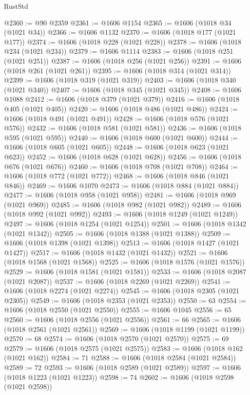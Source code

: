 \begin{lexlean}{RustStd}
\begin{coremodule}
{\begin{coremodule}
{{{{{{{{{{{{{{{{{{{{{{{{{{{{{{{{{{{{{{{{{{{{{{{{{{{{{{{{{{{{{{{{{{{{@2360 := @90 @2359
@2361 := @1606 @1154
@2365 := @1606 (@1018 @34 (@1021 @34))
@2366 := @1606 @1132
@2370 := @1606 (@1018 @177 (@1021 @177))
@2374 := @1606 (@1018 @228 (@1021 @228))
@2378 := @1606 (@1018 @234 (@1021 @234))
@2379 := @1606 @1114
@2383 := @1606 (@1018 @251 (@1021 @251))
@2387 := @1606 (@1018 @256 (@1021 @256))
@2391 := @1606 (@1018 @261 (@1021 @261))
@2395 := @1606 (@1018 @314 (@1021 @314))
@2399 := @1606 (@1018 @319 (@1021 @319))
@2403 := @1606 (@1018 @340 (@1021 @340))
@2407 := @1606 (@1018 @345 (@1021 @345))
@2408 := @1606 @1088
@2412 := @1606 (@1018 @379 (@1021 @379))
@2416 := @1606 (@1018 @405 (@1021 @405))
@2420 := @1606 (@1018 @486 (@1021 @486))
@2424 := @1606 (@1018 @491 (@1021 @491))
@2428 := @1606 (@1018 @576 (@1021 @576))
@2432 := @1606 (@1018 @581 (@1021 @581))
@2436 := @1606 (@1018 @595 (@1021 @595))
@2440 := @1606 (@1018 @600 (@1021 @600))
@2444 := @1606 (@1018 @605 (@1021 @605))
@2448 := @1606 (@1018 @623 (@1021 @623))
@2452 := @1606 (@1018 @628 (@1021 @628))
@2456 := @1606 (@1018 @676 (@1021 @676))
@2460 := @1606 (@1018 @708 (@1021 @708))
@2464 := @1606 (@1018 @772 (@1021 @772))
@2468 := @1606 (@1018 @846 (@1021 @846))
@2469 := @1606 @1070
@2473 := @1606 (@1018 @884 (@1021 @884))
@2477 := @1606 (@1018 @958 (@1021 @958))
@2481 := @1606 (@1018 @969 (@1021 @969))
@2485 := @1606 (@1018 @982 (@1021 @982))
@2489 := @1606 (@1018 @992 (@1021 @992))
@2493 := @1606 (@1018 @1249 (@1021 @1249))
@2497 := @1606 (@1018 @1254 (@1021 @1254))
@2501 := @1606 (@1018 @1342 (@1021 @1342))
@2505 := @1606 (@1018 @1388 (@1021 @1388))
@2509 := @1606 (@1018 @1398 (@1021 @1398))
@2513 := @1606 (@1018 @1427 (@1021 @1427))
@2517 := @1606 (@1018 @1432 (@1021 @1432))
@2521 := @1606 (@1018 @1568 (@1021 @1568))
@2525 := @1606 (@1018 @1576 (@1021 @1576))
@2529 := @1606 (@1018 @1581 (@1021 @1581))
@2533 := @1606 (@1018 @2087 (@1021 @2087))
@2537 := @1606 (@1018 @2269 (@1021 @2269))
@2541 := @1606 (@1018 @2274 (@1021 @2274))
@2545 := @1606 (@1018 @2305 (@1021 @2305))
@2549 := @1606 (@1018 @2353 (@1021 @2353))
@2550 := 63
@2554 := @1606 (@1018 @2550 (@1021 @2550))
@2555 := @1606 @1045
@2556 := 65
@2560 := @1606 (@1018 @2556 (@1021 @2556))
@2561 := 66
@2565 := @1606 (@1018 @2561 (@1021 @2561))
@2569 := @1606 (@1018 @1199 (@1021 @1199))
@2570 := 68
@2574 := @1606 (@1018 @2570 (@1021 @2570))
@2575 := 69
@2579 := @1606 (@1018 @2575 (@1021 @2575))
@2583 := @1606 (@1018 @162 (@1021 @162))
@2584 := 71
@2588 := @1606 (@1018 @2584 (@1021 @2584))
@2589 := 72
@2593 := @1606 (@1018 @2589 (@1021 @2589))
@2597 := @1606 (@1018 @1223 (@1021 @1223))
@2598 := 74
@2602 := @1606 (@1018 @2598 (@1021 @2598))
}}}}}}}}}}}}}}}}}}}}}}}}}}}}}}}}}}}}}}}}}}}}}}}}}}}}}}}}}}}}}}}}}}}}
\end{coremodule}}
\end{coremodule}
\end{lexlean}
